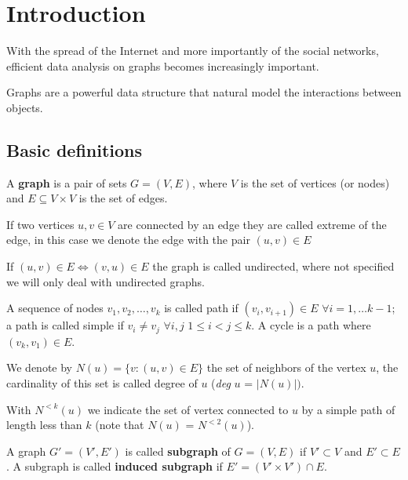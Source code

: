 
\chapter{Introduction}

With the spread of the Internet and more importantly of the social networks, efficient data analysis on graphs becomes increasingly important. 

Graphs are a powerful data structure that natural model the interactions between objects.

\section{Basic definitions}

\begin{definizione}\label{def:graph}
	A \textbf{graph} is a pair of sets $G=(V,E)$, where $V$ is the set of vertices (or nodes) and $E \subseteq V \times V$ is the set of edges.
\end{definizione}

If two vertices $u, v \in V$ are connected by an edge they are called extreme of the edge, in this case we denote the edge with the pair $(u, v) \in E$

If $(u,v) \in E \Leftrightarrow (v,u) \in E$ the graph is called undirected, where not specified we will only deal with undirected graphs.

A sequence of nodes  $v_{1}, v_{2}, \ldots, v_{k}$ is called path if $(v_{i}, v_{i+1}) \in E$ $\forall i = 1, \ldots k-1$; a path is called simple if $v_{i} \neq v_{j}$ $\forall i,j$ $1 \leq i < j \leq k$. A cycle is a path where $(v_{k}, v_{1}) \in E$.

We denote by $N(u) = \{ v : (u,v) \in E \}$ the set of neighbors of the vertex $u$, the cardinality of this set is called degree of $u$ (\textit{deg} $u$ = $|N(u)|)$. 

With $N^{<k}(u)$ we indicate the set of vertex connected to $u$ by a simple path of length less than $k$ (note that $N(u)$ = $N^{<2}(u)$).

\begin{definizione}\label{def:subgraph}
	A graph $G' = (V', E')$ is called \textbf{subgraph} of $G=(V,E)$ if $V' \subset V$ and $E' \subset E$. A subgraph is called \textbf{induced subgraph} if $E' = (V' \times V') \cap E$.
\end{definizione}


